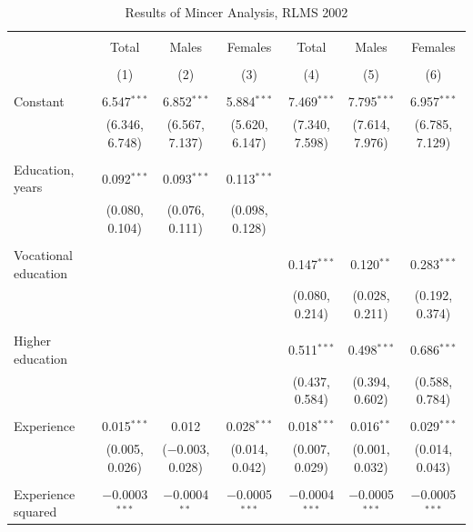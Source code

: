 \documentclass[alpha-refs]{wiley-article-01g}
\begin{document}
\begin{landscape}
	
	\fontsize{9}{11}
	\selectfont
	
	\begin{table}[!htbp] \centering 
\renewcommand{\arraystretch}{1.0}
		\caption{Results of Mincer Analysis, RLMS 2002} 
		\label{} 
		\begin{tabular}{@{\extracolsep{5pt}}lcccccc} 
			\\[-.8ex]\hline 
			\hline \\[-.8ex] 
			& Total & Males & Females & Total & Males & Females \\ 
			\\[-.8ex] & (1) & (2) & (3) & (4) & (5) & (6)\\ 
			\hline \\[-.8ex] 
			Constant & 6.547$^{***}$ & 6.852$^{***}$ & 5.884$^{***}$ & 7.469$^{***}$ & 7.795$^{***}$ & 6.957$^{***}$ \\ 
			& (6.346, 6.748) & (6.567, 7.137) & (5.620, 6.147) & (7.340, 7.598) & (7.614, 7.976) & (6.785, 7.129) \\ 
			& & & & & & \\ 
			Education, years & 0.092$^{***}$ & 0.093$^{***}$ & 0.113$^{***}$ &  &  &  \\ 
			& (0.080, 0.104) & (0.076, 0.111) & (0.098, 0.128) &  &  &  \\ 
			& & & & & & \\ 
			Vocational education &  &  &  & 0.147$^{***}$ & 0.120$^{**}$ & 0.283$^{***}$ \\ 
			&  &  &  & (0.080, 0.214) & (0.028, 0.211) & (0.192, 0.374) \\ 
			& & & & & & \\ 
			Higher education &  &  &  & 0.511$^{***}$ & 0.498$^{***}$ & 0.686$^{***}$ \\ 
			&  &  &  & (0.437, 0.584) & (0.394, 0.602) & (0.588, 0.784) \\ 
			& & & & & & \\ 
			Experience & 0.015$^{***}$ & 0.012 & 0.028$^{***}$ & 0.018$^{***}$ & 0.016$^{**}$ & 0.029$^{***}$ \\ 
			& (0.005, 0.026) & ($-$0.003, 0.028) & (0.014, 0.042) & (0.007, 0.029) & (0.001, 0.032) & (0.014, 0.043) \\ 
			& & & & & & \\ 
			Experience squared & $-$0.0003$^{***}$ & $-$0.0004$^{**}$ & $-$0.0005$^{***}$ & $-$0.0004$^{***}$ & $-$0.0005$^{***}$ & $-$0.0005$^{***}$ \\ 

\end{tabular}
\end{table}
\end{landscape}
\end{document}
